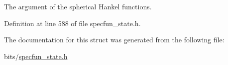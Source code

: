 The argument of the spherical Hankel functions. 



Definition at line 588 of file specfun\+\_\+state.\+h.



The documentation for this struct was generated from the following file\+:\begin{DoxyCompactItemize}
\item 
bits/\hyperlink{specfun__state_8h}{specfun\+\_\+state.\+h}\end{DoxyCompactItemize}
